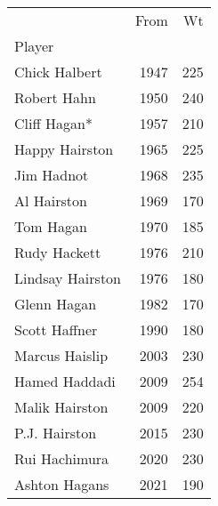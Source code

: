 \begin{tabular}{lrr}
\toprule
{} &  From &   Wt \\
Player           &       &      \\
\midrule
Chick Halbert    &  1947 &  225 \\
Robert Hahn      &  1950 &  240 \\
Cliff Hagan*     &  1957 &  210 \\
Happy Hairston   &  1965 &  225 \\
Jim Hadnot       &  1968 &  235 \\
Al Hairston      &  1969 &  170 \\
Tom Hagan        &  1970 &  185 \\
Rudy Hackett     &  1976 &  210 \\
Lindsay Hairston &  1976 &  180 \\
Glenn Hagan      &  1982 &  170 \\
Scott Haffner    &  1990 &  180 \\
Marcus Haislip   &  2003 &  230 \\
Hamed Haddadi    &  2009 &  254 \\
Malik Hairston   &  2009 &  220 \\
P.J. Hairston    &  2015 &  230 \\
Rui Hachimura    &  2020 &  230 \\
Ashton Hagans    &  2021 &  190 \\
\bottomrule
\end{tabular}
